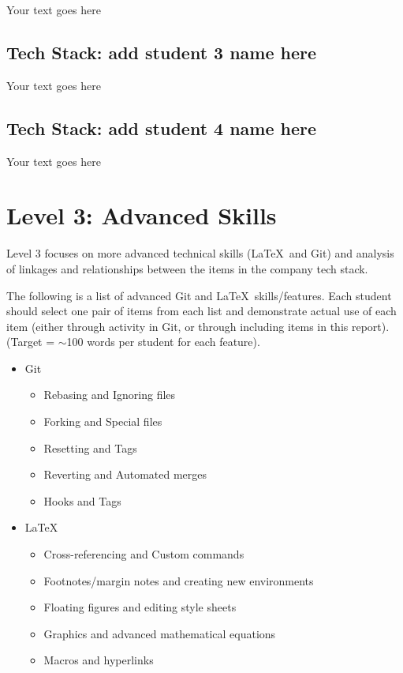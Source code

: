 \documentclass[a4paper, 11pt]{report}
\begin{document}
Your text goes here

\subsection{Tech Stack: add student 3 name here}

Your text goes here

\subsection{Tech Stack: add student 4 name here}

Your text goes here



\newpage
\section{Level 3: Advanced Skills}

Level 3 focuses on more advanced technical skills (\LaTeX\ and Git) and analysis of linkages and relationships between the items in the company tech stack.

The following is a list of advanced Git and \LaTeX\ skills/features. Each student should select one pair of items from each list and demonstrate actual use of each item (either through activity in Git, or through including items in this report). (Target = $\sim$100 words per student for each feature).
\begin{itemize}
    \item Git
    \begin{itemize}
        \item Rebasing and Ignoring files
        \item Forking and Special files
        \item Resetting and Tags
        \item Reverting and Automated merges
        \item Hooks and Tags
    \end{itemize}
    \item \LaTeX\ 
    \begin{itemize}
        \item Cross-referencing and Custom commands
        \item Footnotes/margin notes and creating new environments
        \item Floating figures and editing style sheets
        \item Graphics and advanced mathematical equations
        \item Macros and hyperlinks
    \end{itemize}
\end{itemize}
\end{document}
